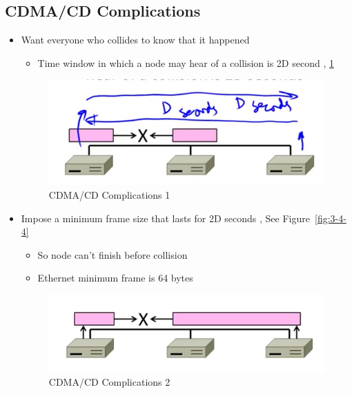 \documentclass[12pt]{ctexart}   %
\begin{document}
	\subsection{CDMA/CD Complications}
	\begin{itemize}
		\item Want everyone who collides to know that it happened
		\begin{itemize}
			\item Time window in which a node may hear of a collision is 2D second , \ref{fig:3-4-5}
		\end{itemize}
		
		\begin{figure}[h!] %
		\centering
		 \includegraphics[scale=0.7]{images/3-4-5}
		\caption{ CDMA/CD Complications 1 }
		 \label{fig:3-4-5}
		 \end{figure}
		 
		 \item Impose a minimum frame size that lasts for 2D seconds , See Figure~\ref{fig:3-4-4}
		 \begin{itemize}
		 	\item So node can't finish before collision
		 	\item Ethernet minimum frame is 64 bytes
		 \end{itemize}
		 
		 \begin{figure}[h!] %
		\centering
		 \includegraphics[scale=0.7]{images/3-4-6}
		\caption{ CDMA/CD Complications 2 }
		 \label{fig:3-4-6}
		 \end{figure}
	\end{itemize}
	
\end{document}
